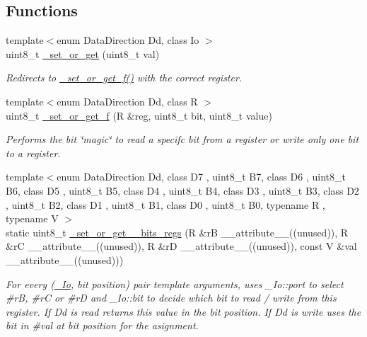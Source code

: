 \subsection*{Functions}
\begin{DoxyCompactItemize}
\item 
{\footnotesize template$<$enum Data\+Direction Dd, class Io $>$ }\\uint8\+\_\+t \hyperlink{namespaceports_aa339a9d178cb414c4cf243450d5887d2}{\+\_\+set\+\_\+or\+\_\+get} (uint8\+\_\+t val)
\begin{DoxyCompactList}\small\item\em Redirects to \hyperlink{namespaceports_a75686ee2e9a291c0095dec6d73e4af8d}{\+\_\+set\+\_\+or\+\_\+get\+\_\+f()} with the correct register. \end{DoxyCompactList}\item 
{\footnotesize template$<$enum Data\+Direction Dd, class R $>$ }\\uint8\+\_\+t \hyperlink{namespaceports_a75686ee2e9a291c0095dec6d73e4af8d}{\+\_\+set\+\_\+or\+\_\+get\+\_\+f} (R \&reg, uint8\+\_\+t bit, uint8\+\_\+t value)
\begin{DoxyCompactList}\small\item\em Performs the bit \char`\"{}magic\char`\"{} to read a specifc bit from a register or write only one bit to a register. \end{DoxyCompactList}\item 
{\footnotesize template$<$enum Data\+Direction Dd, class D7 , uint8\+\_\+t B7, class D6 , uint8\+\_\+t B6, class D5 , uint8\+\_\+t B5, class D4 , uint8\+\_\+t B4, class D3 , uint8\+\_\+t B3, class D2 , uint8\+\_\+t B2, class D1 , uint8\+\_\+t B1, class D0 , uint8\+\_\+t B0, typename R , typename V $>$ }\\static uint8\+\_\+t \hyperlink{namespaceports_a49c5f4c094bbfe316f3d63897cd7f6a6}{\+\_\+set\+\_\+or\+\_\+get\+\_\+\_\+bits\+\_\+regs} (R \&rB \+\_\+\+\_\+attribute\+\_\+\+\_\+((unused)), R \&rC \+\_\+\+\_\+attribute\+\_\+\+\_\+((unused)), R \&rD \+\_\+\+\_\+attribute\+\_\+\+\_\+((unused)), const V \&val \+\_\+\+\_\+attribute\+\_\+\+\_\+((unused)))
\begin{DoxyCompactList}\small\item\em For every (\hyperlink{structports_1_1__Io}{\+\_\+\+Io}, \textquotesingle{}bit position\textquotesingle{}) pair template arguments, uses \+\_\+\+Io\+::port to select \#rB, \#rC or \#rD and \+\_\+\+Io\+::bit to decide which bit to read / write from this register. If Dd is read returns this value in the \textquotesingle{}bit position\textquotesingle{}. If Dd is write uses the bit in \#val at \textquotesingle{}bit position\textquotesingle{} for the asignment. \end{DoxyCompactList}\item 

\end{DoxyCompactItemize}
